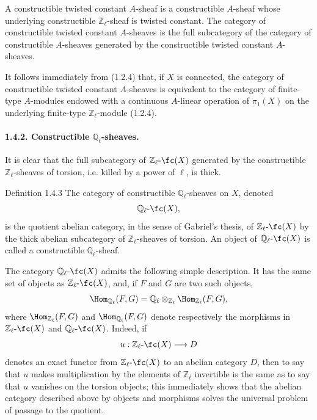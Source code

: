 A constructible twisted constant \(A\)-sheaf is a constructible \(A\)-sheaf whose underlying constructible \(\mathbb Z_\ell\)-sheaf is twisted constant. The category of constructible twisted constant \(A\)-sheaves is the full subcategory of the category of constructible \(A\)-sheaves generated by the constructible twisted constant \(A\)-sheaves.

It follows immediately from (1.2.4) that, if \(X\) is connected, the category of constructible twisted constant \(A\)-sheaves is equivalent to the category of finite-type \(A\)-modules endowed with a continuous \(A\)-linear operation of \(\pi_1(X)\) on the underlying finite-type \(\mathbb Z_\ell\)-module (1.2.4).

\paragraph{1.4.2. Constructible \(\mathbb Q_\ell\)-sheaves.}
It is clear that the full subcategory of \(\mathbb Z_\ell\text{-}\fc(X)\) generated by the constructible \(\mathbb Z_\ell\)-sheaves of torsion, i.e. killed by a power of \(\ell\), is thick.

\begin{statement}{Definition 1.4.3}
The category of constructible \(\mathbb Q_\ell\)-sheaves on \(X\), denoted
\[
\mathbb Q_\ell\text{-}\fc(X),
\]
is the quotient abelian category, in the sense of Gabriel's thesis, of \(\mathbb Z_\ell\text{-}\fc(X)\) by the thick abelian subcategory of \(\mathbb Z_\ell\)-sheaves of torsion. An object of \(\mathbb Q_\ell\text{-}\fc(X)\) is called a constructible \(\mathbb Q_\ell\)-sheaf.
\end{statement}

The category \(\mathbb Q_\ell\text{-}\fc(X)\) admits the following simple description. It has the same set of objects as \(\mathbb Z_\ell\text{-}\fc(X)\), and, if \(F\) and \(G\) are two such objects,
\[
\Hom_{\mathbb Q_\ell}(F,G)
=\mathbb Q_\ell\otimes_{\mathbb Z_\ell}\Hom_{\mathbb Z_\ell}(F,G),
\]
where \(\Hom_{\mathbb Z_\ell}(F,G)\) and \(\Hom_{\mathbb Q_\ell}(F,G)\) denote respectively the morphisms in \(\mathbb Z_\ell\text{-}\fc(X)\) and \(\mathbb Q_\ell\text{-}\fc(X)\). Indeed, if
\[
u:\mathbb Z_\ell\text{-}\fc(X)\longrightarrow D
\]
denotes an exact functor from \(\mathbb Z_\ell\text{-}\fc(X)\) to an abelian category \(D\), then to say that \(u\) makes multiplication by the elements of \(\mathbb Z_\ell\) invertible is the same as to say that \(u\) vanishes on the torsion objects; this immediately shows that the abelian category described above by objects and morphisms solves the universal problem of passage to the quotient.

